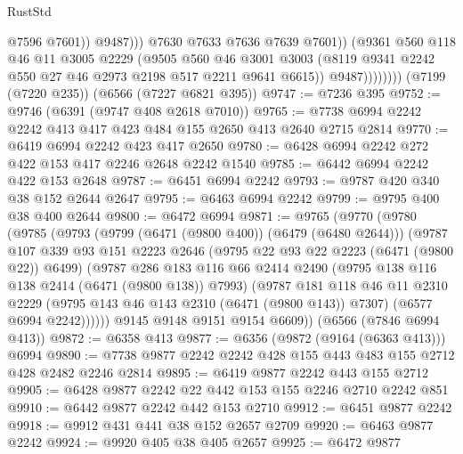 \begin{lexlean}{RustStd}
\begin{coremodule}
                                @7596
                                @7601))
                            @9487)))
                      @7630
                      @7633
                      @7636
                      @7639
                      @7601))
                  (@9361
                    @560
                    @118
                    @46
                    @11
                    @3005
                    @2229
                    (@9505
                      @560
                      @46
                      @3001
                      @3003
                      (@8119 @9341 @2242 @550 @27 @46 @2973 @2198 @517 @2211 @9641 @6615))
                    @9487))))))))
    (@7199 (@7220 @235))
    (@6566 (@7227 @6821 @395))
@9747 := @7236 @395
@9752 := @9746 (@6391 (@9747 @408 @2618 @7010))
@9765 := @7738 @6994 @2242 @2242 @413 @417 @423 @484 @155 @2650 @413 @2640 @2715 @2814
@9770 := @6419 @6994 @2242 @423 @417 @2650
@9780 := @6428 @6994 @2242 @272 @422 @153 @417 @2246 @2648 @2242 @1540
@9785 := @6442 @6994 @2242 @422 @153 @2648
@9787 := @6451 @6994 @2242
@9793 := @9787 @420 @340 @38 @152 @2644 @2647
@9795 := @6463 @6994 @2242
@9799 := @9795 @400 @38 @400 @2644
@9800 := @6472 @6994
@9871 := @9765
    (@9770
      (@9780
        (@9785
          (@9793
            (@9799 (@6471 (@9800 @400)) (@6479 (@6480 @2644)))
            (@9787
              @107
              @339
              @93
              @151
              @2223
              @2646
              (@9795 @22 @93 @22 @2223 (@6471 (@9800 @22)) @6499)
              (@9787
                @286
                @183
                @116
                @66
                @2414
                @2490
                (@9795 @138 @116 @138 @2414 (@6471 (@9800 @138)) @7993)
                (@9787
                  @181
                  @118
                  @46
                  @11
                  @2310
                  @2229
                  (@9795 @143 @46 @143 @2310 (@6471 (@9800 @143)) @7307)
                  (@6577 @6994 @2242))))))
        @9145
        @9148
        @9151
        @9154
        @6609))
    (@6566 (@7846 @6994 @413))
@9872 := @6358 @413
@9877 := @6356 (@9872 (@9164 (@6363 @413))) @6994
@9890 := @7738 @9877 @2242 @2242 @428 @155 @443 @483 @155 @2712 @428 @2482 @2246 @2814
@9895 := @6419 @9877 @2242 @443 @155 @2712
@9905 := @6428 @9877 @2242 @22 @442 @153 @155 @2246 @2710 @2242 @851
@9910 := @6442 @9877 @2242 @442 @153 @2710
@9912 := @6451 @9877 @2242
@9918 := @9912 @431 @441 @38 @152 @2657 @2709
@9920 := @6463 @9877 @2242
@9924 := @9920 @405 @38 @405 @2657
@9925 := @6472 @9877

\end{coremodule}
\end{lexlean}
